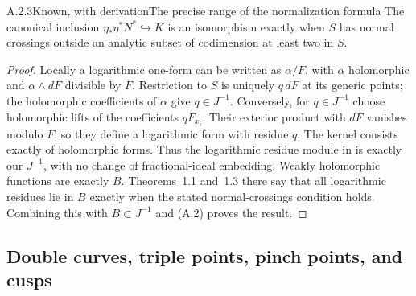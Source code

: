 \begin{statement}{A.2.3}{Known, with derivation}{The precise range of the normalization formula}
The canonical inclusion $\eta_*\eta^*N^*\hookrightarrow K$ is an isomorphism exactly when $S$ has normal crossings outside an analytic subset of codimension at least two in $S$.
\end{statement}
\begin{proof}
Locally a logarithmic one-form can be written as $\alpha/F$, with $\alpha$ holomorphic and $\alpha\wedge dF$ divisible by $F$. Restriction to $S$ is uniquely $q\,dF$ at its generic points; the holomorphic coefficients of $\alpha$ give $q\in J^{-1}$. Conversely, for $q\in J^{-1}$ choose holomorphic lifts of the coefficients $qF_{x_i}$. Their exterior product with $dF$ vanishes modulo $F$, so they define a logarithmic form with residue $q$. The kernel consists exactly of holomorphic forms. Thus the logarithmic residue module in \cite[Proposition~3.4]{GS2014} is exactly our $J^{-1}$, with no change of fractional-ideal embedding. Weakly holomorphic functions are exactly $B$. Theorems~1.1 and~1.3 there say that all logarithmic residues lie in $B$ exactly when the stated normal-crossings condition holds. Combining this with $B\subset J^{-1}$ and (A.2) proves the result.
\end{proof}

\subsection{Double curves, triple points, pinch points, and cusps}

